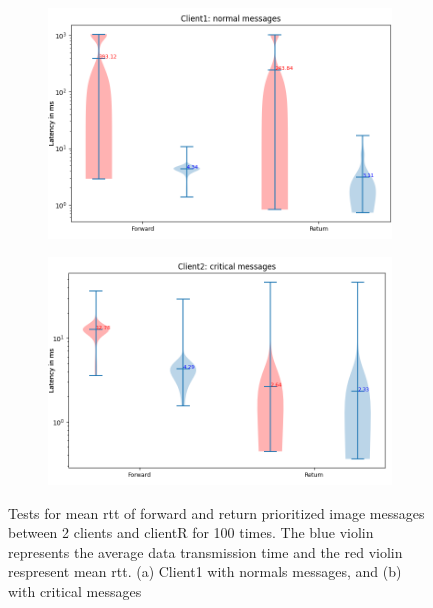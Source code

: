 \begin{figure}[h]
    \centering
    \begin{subfigure}[b]{0.79\textwidth}
    \includegraphics[width=\textwidth]{figures/appendix/priority_tests/log_violin_2clients_image_priority_client1.png}\hfill 
    \caption{} \label{fig: priority-2clients-image-1}
    \end{subfigure}
    \begin{subfigure}[b]{0.79\textwidth}
        \includegraphics[width=\textwidth]{figures/appendix/priority_tests/log_violin_2clients_image_priority_client2.png}\hfill 
        \caption{} \label{fig: priority-2clients-image-2}
    \end{subfigure}
    
    
    \caption{Tests for mean \gls{rtt} of forward and return prioritized image messages between 2 clients 
    and clientR for 100 times. The blue violin represents the average data transmission time and the red violin 
    respresent mean \gls{rtt}. (a) Client1 with normals messages, and (b) 
    with critical messages} \label{fig: priority-2clients-image}
\end{figure}



